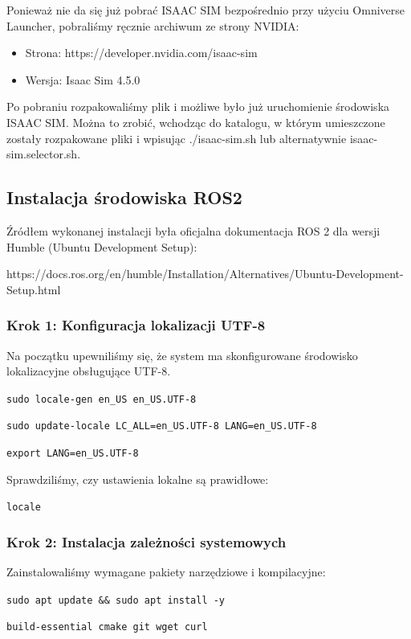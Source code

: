 \documentclass[12pt]{article}
\begin{document}
Ponieważ nie da się już pobrać ISAAC SIM bezpośrednio przy użyciu Omniverse Launcher, pobraliśmy ręcznie archiwum ze strony NVIDIA:

\begin{itemize}
    \item Strona: https://developer.nvidia.com/isaac-sim
    \item Wersja: Isaac Sim 4.5.0
\end{itemize}

Po pobraniu rozpakowaliśmy plik i możliwe było już uruchomienie środowiska ISAAC SIM. Można to zrobić, wchodząc do katalogu, w którym umieszczone zostały rozpakowane pliki i wpisując ./isaac-sim.sh lub alternatywnie isaac-sim.selector.sh.

 

\subsection{Instalacja środowiska ROS2}

Źródłem wykonanej instalacji była oficjalna dokumentacja ROS 2 dla wersji Humble (Ubuntu Development Setup):

 https://docs.ros.org/en/humble/Installation/Alternatives/Ubuntu-Development-Setup.html


\subsubsection{Krok 1: Konfiguracja lokalizacji UTF-8}
Na początku upewniliśmy się, że system ma skonfigurowane środowisko lokalizacyjne obsługujące UTF-8.


\texttt{sudo locale-gen en\_US en\_US.UTF-8}

\texttt{sudo update-locale LC\_ALL=en\_US.UTF-8 LANG=en\_US.UTF-8}

\texttt{export LANG=en\_US.UTF-8}

Sprawdziliśmy, czy ustawienia lokalne są prawidłowe:

\texttt{locale}

\subsubsection{Krok 2: Instalacja zależności systemowych}
Zainstalowaliśmy wymagane pakiety narzędziowe i kompilacyjne:

\texttt{sudo apt update \&\& sudo apt install -y}


\texttt{build-essential cmake git wget curl}
\end{document}
